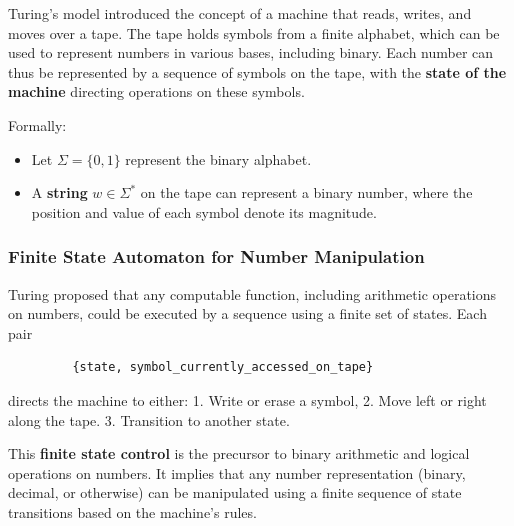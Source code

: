 Turing’s model introduced the concept of a machine that reads, writes, and moves over a tape. The tape holds symbols from a finite alphabet, which can be used to represent numbers in various bases, including binary. Each number can thus be represented by a sequence of symbols on the tape, with the \textbf{state of the machine} directing operations on these symbols.

Formally:
\begin{itemize}
    \item Let \( \Sigma = \{0, 1\} \) represent the binary alphabet.
    \item A \textbf{string} \( w \in \Sigma^* \) on the tape can represent a binary number, where the position and value of each symbol denote its magnitude.
\end{itemize}

\subsubsection{Finite State Automaton for Number Manipulation}

Turing proposed that any computable function, including arithmetic operations on numbers, could be executed by a sequence using a finite set of states. Each pair 
\begin{verbatim} 
         {state, symbol_currently_accessed_on_tape} 
\end{verbatim} 
directs the machine to either:
1. Write or erase a symbol, 
2. Move left or right along the tape.
3. Transition to another state.

This \textbf{finite state control} is the precursor to binary arithmetic and logical operations on numbers. It implies that any number representation (binary, decimal, or otherwise) can be manipulated using a finite sequence of state transitions based on the machine's rules.


